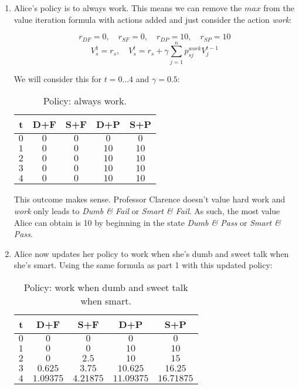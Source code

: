 \documentclass[fleqn]{hw}
\begin{document}
\begin{enumerate}

\item Alice's policy is to always work. This means we can remove the $max$ from the value iteration formula with actions added and just consider the action \textit{work}:

$$r_{DF} = 0, \quad r_{SF} = 0, \quad r_{DP} = 10, \quad r_{SP} = 10$$
$$V_s^1 = r_s, \quad V_s^t = r_s + \gamma \sum_{j = 1}^n p_{sj}^{work} V_j^{t-1}$$

We will consider this for $t = 0\dots4$ and $\gamma = 0.5$:

\begin{table}[H]
\centering
\begin{tabular}{|c||c|c|c|c|}
\hline
{\bf t} & D+F & S+F & D+P & S+P \\
\hline
$0$ & $0$ & $0$ & $0$  & $0$  \\
\hline
$1$ & $0$ & $0$ & $10$ & $10$ \\
\hline
$2$ & $0$ & $0$ & $10$ & $10$ \\
\hline
$3$ & $0$ & $0$ & $10$ & $10$ \\
\hline
$4$ & $0$ & $0$ & $10$ & $10$ \\
\hline
\end{tabular}
\caption{Policy: always work.}
\end{table}

This outcome makes sense. Professor Clarence doesn't value hard work and \textit{work} only leads to \textit{Dumb \& Fail} or \textit{Smart \& Fail}. As such, the most value Alice can obtain is 10 by beginning in the state \textit{Dumb \& Pass} or \textit{Smart \& Pass}.

\item Alice now updates her policy to work when she's dumb and sweet talk when she's smart. Using the same formula as part 1 with this updated policy:

\begin{table}[H]
\centering
\begin{tabular}{|c||c|c|c|c|}
\hline
{\bf t} & D+F & S+F & D+P & S+P \\
\hline
$0$ & $0$ & $0$ & $0$  & $0$  \\
\hline
$1$ & $0$ & $0$ & $10$ & $10$ \\
\hline
$2$ & $0$ & $2.5$ & $10$ & $15$ \\
\hline
$3$ & $0.625$ & $3.75$ & $10.625$ & $16.25$ \\
\hline
$4$ & $1.09375$ & $4.21875$ & $11.09375$ & $16.71875$ \\
\hline
\end{tabular}
\caption{Policy: work when dumb and sweet talk when smart.}
\end{table}


\end{enumerate}
\end{document}
